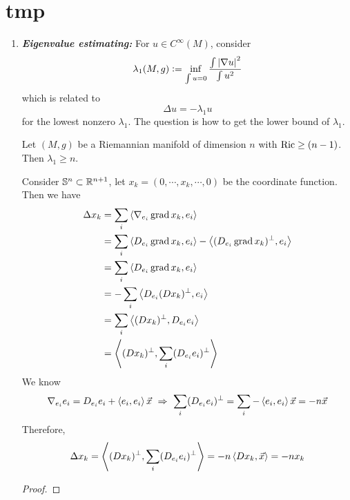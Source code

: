 \chapter{tmp}

\begin{enumerate}[label=\arabic{*}.]
	\item \emph{\textbf{Eigenvalue estimating:}} For $u \in C^\infty(M)$, consider
	\begin{equation*}
		\lambda_1(M,g) \vcentcolon= \inf_{\int u = 0}\frac{\int \left\lvert\nabla u\right\lvert^2}{\int u^2}
	\end{equation*}
	which is related to
	\begin{equation*}
	    \Delta u = -\lambda_1 u
	\end{equation*}
	for the lowest nonzero $\lambda_1$. The question is how to get the lower bound of $\lambda_1$.
	\begin{thm}
	    Let $(M,g)$ be a Riemannian manifold of dimension $n$ with $\operatorname{Ric} \geq (n-1)$. Then $\lambda_1 \geq n$.
	\end{thm}
	\begin{exam}[Sphere]
	    Consider $\mathbb{S}^n \subset \mathbb{R}^{n+1}$, let $x_k = (0,\cdots,x_k,\cdots,0)$ be the coordinate function. Then we have
	    \begin{equation*}
	        \begin{aligned}
	        	\Delta x_k &= \sum_{i} \left\langle \nabla_{e_i}\operatorname{grad}x_k,e_i \right\rangle \\
	        	&= \sum_{i} \left\langle D_{e_i}\operatorname{grad}x_k,e_i \right\rangle - \left\langle (D_{e_i}\operatorname{grad}x_k)^\perp,e_i \right\rangle\\
	        	&= \sum_{i} \left\langle D_{e_i}\operatorname{grad}x_k,e_i \right\rangle\\
	        	&= -\sum_{i} \left\langle D_{e_i}(Dx_k)^\perp,e_i \right\rangle\\
	        	&= \sum_{i} \left\langle (Dx_k)^\perp,D_{e_i}e_i \right\rangle\\
	        	&= \left\langle (Dx_k)^\perp,\sum_{i}(D_{e_i}e_i)^\perp \right\rangle\\
	        \end{aligned}
	    \end{equation*}
	    We know
	    \begin{equation*}
	        \nabla_{e_i}e_i = D_{e_i}e_i + \left\langle e_i,e_i \right\rangle\vec{x}~\Rightarrow~\sum_{i}(D_{e_i}e_i)^\perp = \sum_{i}-\left\langle e_i,e_i \right\rangle\vec{x} = - n\vec{x}
	    \end{equation*}
	    Therefore,
	    \begin{equation*}
	        \Delta x_k = \left\langle (Dx_k)^\perp,\sum_{i}(D_{e_i}e_i)^\perp \right\rangle = -n\left\langle Dx_k,\vec{x} \right\rangle = -n x_k
	    \end{equation*}
	        
	  
	        
	  
	\end{exam}
	\begin{proof}
	    
	\end{proof}








\end{enumerate}



	